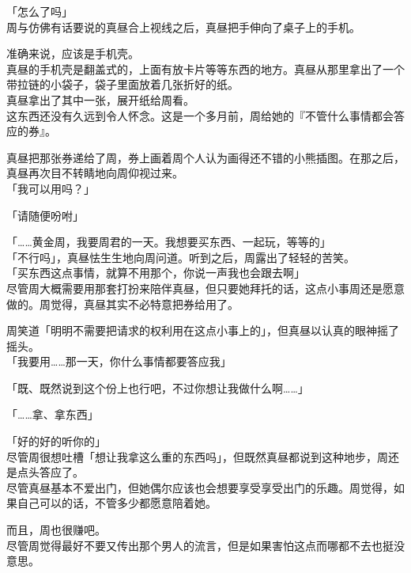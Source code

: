 「怎么了吗」\\

周与仿佛有话要说的真昼合上视线之后，真昼把手伸向了桌子上的手机。

准确来说，应该是手机壳。\\

真昼的手机壳是翻盖式的，上面有放卡片等等东西的地方。真昼从那里拿出了一个带拉链的小袋子，袋子里面放着几张折好的纸。\\

真昼拿出了其中一张，展开纸给周看。\\

这东西还没有久远到令人怀念。这是一个多月前，周给她的『不管什么事情都会答应的券』。

真昼把那张券递给了周，券上画着周个人认为画得还不错的小熊插图。在那之后，真昼再次目不转睛地向周仰视过来。\\

「我可以用吗？」

「请随便吩咐」

「……黄金周，我要周君的一天。我想要买东西、一起玩，等等的」\\

「不行吗」，真昼怯生生地向周问道。听到之后，周露出了轻轻的苦笑。\\

「买东西这点事情，就算不用那个，你说一声我也会跟去啊」\\

尽管周大概需要用那套打扮来陪伴真昼，但只要她拜托的话，这点小事周还是愿意做的。周觉得，真昼其实不必特意把券给用了。

周笑道「明明不需要把请求的权利用在这点小事上的」，但真昼以认真的眼神摇了摇头。\\

「我要用……那一天，你什么事情都要答应我」

「既、既然说到这个份上也行吧，不过你想让我做什么啊……」

「……拿、拿东西」

「好的好的听你的」\\

尽管周很想吐槽「想让我拿这么重的东西吗」，但既然真昼都说到这种地步，周还是点头答应了。\\

尽管真昼基本不爱出门，但她偶尔应该也会想要享受享受出门的乐趣。周觉得，如果自己可以的话，不管多少都愿意陪着她。

而且，周也很赚吧。\\

尽管周觉得最好不要又传出那个男人的流言，但是如果害怕这点而哪都不去也挺没意思。\\

